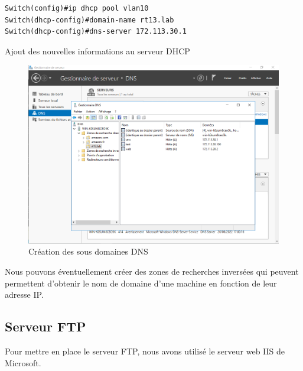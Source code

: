 \documentclass{article}
\begin{document}
\begin{listing}[H]
    \begin{verbatim}
Switch(config)#ip dhcp pool vlan10
Switch(dhcp-config)#domain-name rt13.lab
Switch(dhcp-config)#dns-server 172.113.30.1
    \end{verbatim}
    \caption{Ajout des nouvelles informations au serveur DHCP}
    \label{switch:dns-dhcp}
\end{listing}
\begin{figure}[H]
    \begin{center}
        \includegraphics[scale=0.55]{fig/dns-config.png}
    \end{center}
    \caption{Création des sous domaines DNS}
    \label{serv:dns2}
\end{figure}
Nous pouvons éventuellement créer des zones de recherches inversées qui peuvent permettent d'obtenir le nom de domaine d'une machine en fonction de leur adresse IP.
\subsection{Serveur FTP}
Pour mettre en place le serveur FTP, nous avons utilisé le serveur web IIS de Microsoft.
\end{document}
